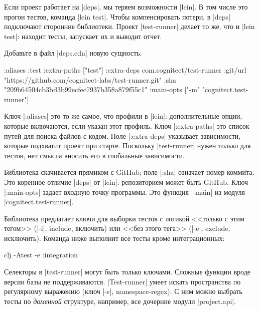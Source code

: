 Если проект работает на \spverb|deps|, мы теряем возможности \spverb|lein|. В
том числе это прогон тестов, команда \spverb|lein test|. Чтобы компенсировать
потери, в \spverb|deps| подключают сторонние библиотеки. Проект
\spverb|test-runner|
делает то же, что и \spverb|lein test|: находит тесты, запускает их и выводит
отчет.

Добавьте в файл \spverb|deps.edn| новую сущность:

\begin{english}
  \begin{clojure}
:aliases
{:test
 {:extra-paths ["test"]
  :extra-deps
  {com.cognitect/test-runner
   {:git/url "https://github.com/cognitect-labs/test-runner.git"
    :sha "209b64504cb3bd3b99ecfec7937b358a879f55c1"}}
  :main-opts ["-m" "cognitect.test-runner"]}}
  \end{clojure}
\end{english}

Ключ \spverb|:aliases| это то же самое, что профили в \spverb|lein|:
дополнительные опции, которые включаются, если указан этот профиль. Ключ
\spverb|:extra-paths| это список путей для поиска файлов с кодом. Поле
\spverb|:extra-deps| указывает зависимости, которые подхватит проект при
старте. Поскольку \spverb|test-runner| нужен только для тестов, нет смысла
вносить его в глобальные зависимости.

Библиотека скачивается прямиком с GitHub; поле \spverb|:sha| означает номер
коммита. Это коренное отличие \spverb|deps| от \spverb|lein|: репозиторием может
быть GitHub. Ключ \spverb|:main-opts| задает входную точку программы. Это
функция \spverb|-main| из модуля \spverb|cognitect.test-runner|.

Библиотека предлагает ключи для выборки тестов с логикой <<только с этим тегом>>
(\spverb|-i|, include, включить) или <<без этого тега>> (\spverb|-e|, exclude,
исключить). Команда ниже выполнит все тесты кроме интеграционных:

\begin{english}
  \begin{bash}
clj -Atest -e :integration
  \end{bash}
\end{english}

Селекторы в \spverb|test-runner| могут быть только ключами. Сложные функции
вроде версии базы не поддерживаются. \spverb|Test-runner| умеет искать
пространства по регулярному выражению (ключ \spverb|-r|, namespace-regex). С ним
можно выбрать тесты по \emph{доменной} структуре, например, все дочерние модули
\spverb|project.api|.

